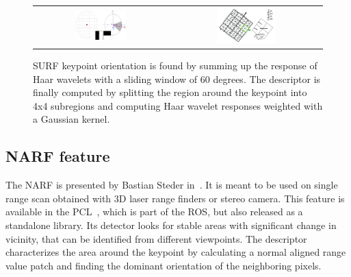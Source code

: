 \begin{figure}[H]
\centering
 \begin{tabular}{cc}
 \includegraphics[width=0.4\textwidth]{figures/surf_orientation} &
 \includegraphics[width=0.4\textwidth]{figures/surf_descriptor}
\end{tabular}
\caption{SURF keypoint orientation is found by summing up the response of Haar wavelets with a sliding window of 60 degrees. The descriptor is finally computed by splitting the region around the keypoint into 4x4 subregions and computing Haar wavelet responses weighted with a Gaussian kernel.}
\label{fig:surf_descriptor}
\end{figure}

\clearpage
\subsection{NARF feature}

The \gls{NARF} is presented by Bastian Steder in~\cite{steder10irosws}. It is meant to be used on single range scan obtained with 3D laser range finders or stereo camera. This feature is available in the \gls{PCL}~\cite{Rusu_ICRA2011_PCL}, which is part of the \gls{ROS}, but also released as a standalone library. Its detector looks for stable areas with significant change in vicinity, that can be identified from different viewpoints. The descriptor characterizes the area around the keypoint by calculating a normal aligned range value patch and finding the dominant orientation of the neighboring pixels.

